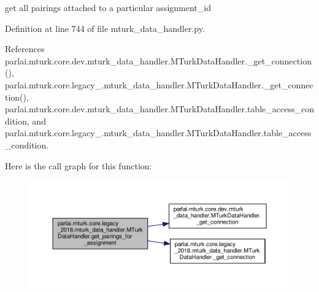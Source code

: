 \begin{DoxyVerb}get all pairings attached to a particular assignment_id\end{DoxyVerb}
 

Definition at line 744 of file mturk\+\_\+data\+\_\+handler.\+py.



References parlai.\+mturk.\+core.\+dev.\+mturk\+\_\+data\+\_\+handler.\+M\+Turk\+Data\+Handler.\+\_\+get\+\_\+connection(), parlai.\+mturk.\+core.\+legacy\+\_.\+mturk\+\_\+data\+\_\+handler.\+M\+Turk\+Data\+Handler.\+\_\+get\+\_\+connection(), parlai.\+mturk.\+core.\+dev.\+mturk\+\_\+data\+\_\+handler.\+M\+Turk\+Data\+Handler.\+table\+\_\+access\+\_\+condition, and parlai.\+mturk.\+core.\+legacy\+\_.\+mturk\+\_\+data\+\_\+handler.\+M\+Turk\+Data\+Handler.\+table\+\_\+access\+\_\+condition.

Here is the call graph for this function\+:
\nopagebreak
\begin{figure}[H]
\begin{center}
\leavevmode
\includegraphics[width=350pt]{classparlai_1_1mturk_1_1core_1_1legacy__2018_1_1mturk__data__handler_1_1MTurkDataHandler_a1ca83cec6867537d2a72e47beee0ca84_cgraph}
\end{center}
\end{figure}
\mbox{\label{classparlai_1_1mturk_1_1core_1_1legacy__2018_1_1mturk__data__handler_1_1MTurkDataHandler_adeb795898ba871fdb1ea3bb7517286d3}} 
